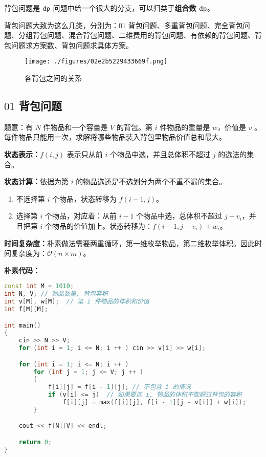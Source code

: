 
背包问题是 $\tt dp$ 问题中给一个很大的分支，可以归类于\textbf{组合数 $\tt dp$}。

背包问题大致为这么几类，分别为：$01$ 背包问题、多重背包问题、完全背包问题、分组背包问题、混合背包问题、二维费用的背包问题、有依赖的背包问题、背包问题求方案数、背包问题求具体方案。

\begin{figure}[ht]
\centering
\texttt{[image: ./figures/02e2b5229433669f.png]}
\caption{各背包之间的关系} \label{fig_dp1_3}
\end{figure}


\subsection{$01$ 背包问题}

题意：有 $N$ 件物品和一个容量是 $V$ 的背包。第 $i$ 件物品的重量是 $w$，价值是 $v$ 。每件物品只能用一次，求解将哪些物品装入背包里物品价值总和最大。

\textbf{状态表示：}$f(i, j)$ 表示只从前 $i$ 个物品中选，并且总体积不超过 $j$ 的选法的集合。

\textbf{
状态计算：}依据为第 $i$ 的物品选还是不选划分为两个不重不漏的集合。

\begin{enumerate}
\item 不选择第 $i$ 个物品，状态转移为 $f(i - 1, j)$。
\item 选择第 $i$ 个物品，对应着：从前 $i - 1$ 个物品中选，总体积不超过 $j - v_i$，并且把第 $i$ 个物品的价值加上。状态转移为：$f(i - 1, j - v_i) + w_i$。
\end{enumerate}

\textbf{时间复杂度：}朴素做法需要两重循环，第一维枚举物品，第二维枚举体积。因此时间复杂度为：$\mathcal{O}(n \times m)$。

\textbf{朴素代码：}

\begin{lstlisting}[language=cpp]
const int M = 1010;
int N, V; // 物品数量, 背包容积
int v[M], w[M];  // 第 i 件物品的体积和价值
int f[M][M];

int main()
{
    cin >> N >> V;
    for (int i = 1; i <= N; i ++ ) cin >> v[i] >> w[i];

    for (int i = 1; i <= N; i ++ )
        for (int j = 1; j <= V; j ++ )
        {
            f[i][j] = f[i - 1][j]; // 不包含 i 的情况
            if (v[i] <= j)  // 如果要选 i, 物品的体积不能超过背包的容积
                f[i][j] = max(f[i][j], f[i - 1][j - v[i]] + w[i]);
        }

    cout << f[N][V] << endl;

    return 0;
}
\end{lstlisting}

